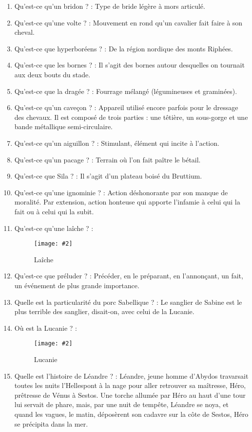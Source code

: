 \documentclass[a4paper, 11pt, hidelinks]{article}
\newcommand{\img}[4]{\begin{figure}[!ht]
    \centering
    \texttt{[image: \#2]}
    \caption{#3}
    \label{#4}
    \end{figure} }
\begin{document}
\begin{enumerate}
      \item Qu'est-ce qu'un bridon ? : Type de bride légère à mors articulé.
      \item Qu'est-ce qu'une volte ? : Mouvement en rond qu'un cavalier fait faire à son cheval.
      \item Qu'est-ce que hyperboréens ? : De la région nordique des monts Riphées.
      \item Qu'est-ce que les bornes ? : Il s'agit des bornes autour desquelles on tournait aux deux bouts du stade.
      \item Qu'est-ce que la dragée ? : Fourrage mélangé (légumineuses et graminées).
      \item Qu'est-ce qu'un caveçon ? : Appareil utilisé encore parfois pour le dressage des chevaux. Il est composé de trois parties : une têtière, un sous-gorge et une bande métallique semi-circulaire.
      \item Qu'est-ce qu'un aiguillon ? : Stimulant, élément qui incite à l'action.
      \item Qu'est-ce qu'un pacage ? : Terrain où l'on fait paître le bétail.
      \item Qu'est-ce que Sila ? : Il s'agit d'un plateau boisé du Bruttium.
      \item Qu'est-ce qu'une ignominie ? : Action déshonorante par son manque de moralité. Par extension, action honteuse qui apporte l'infamie à celui qui la fait ou à celui qui la subit.
      \item Qu'est-ce qu'une laîche ? :
            \img{0.2}{Laîche.jpg}{Laîche}{122}
      \item Qu'est-ce que préluder ? : Précéder, en le préparant, en l'annonçant, un fait, un événement de plus grande importance.
      \item Quelle est la particularité du porc Sabellique ? : Le sanglier de Sabine est le plus terrible des sanglier, disait-on, avec celui de la Lucanie.
      \item Où est la Lucanie ? :
            \img{0.3}{Lucanie.png}{Lucanie}{123}
      \item Quelle est l'histoire de Léandre ? : Léandre, jeune homme d'Abydos travarsait toutes les nuits l'Hellespont à la nage pour aller retrouver sa maîtresse, Héro, prêtresse
            de Vénus à Sestos. Une torche allumée par Héro au haut d'une tour lui servait de phare, mais, par une nuit de tempête, Léandre se noya, et quand les vagues, le matin,
            déposèrent son cadavre sur la côte de Sestos, Héro se précipita dans la mer.

\end{enumerate}
\end{document}

